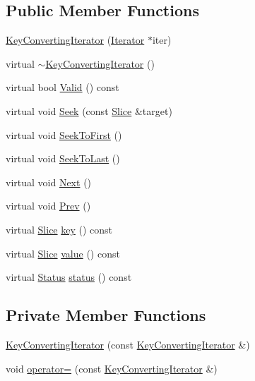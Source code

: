 \subsection*{Public Member Functions}
\begin{DoxyCompactItemize}
\item 
\hyperlink{classleveldb_1_1_key_converting_iterator_a7b5c28a94749f2e02ecc9021bb9adb51}{Key\+Converting\+Iterator} (\hyperlink{classleveldb_1_1_iterator}{Iterator} $\ast$iter)
\item 
virtual \hyperlink{classleveldb_1_1_key_converting_iterator_a2a774b0a90768168394ca0c35ba3a87e}{$\sim$\+Key\+Converting\+Iterator} ()
\item 
virtual bool \hyperlink{classleveldb_1_1_key_converting_iterator_a941cabf2e0b1c9647faa037b7ad55668}{Valid} () const 
\item 
virtual void \hyperlink{classleveldb_1_1_key_converting_iterator_a6af9b763a5831c2fdcd8c3bebfef6ae4}{Seek} (const \hyperlink{classleveldb_1_1_slice}{Slice} \&target)
\item 
virtual void \hyperlink{classleveldb_1_1_key_converting_iterator_a56a6b7b97747d5e33981a66c28670cc9}{Seek\+To\+First} ()
\item 
virtual void \hyperlink{classleveldb_1_1_key_converting_iterator_a9db639879c442a67234fc345887b19fc}{Seek\+To\+Last} ()
\item 
virtual void \hyperlink{classleveldb_1_1_key_converting_iterator_a6b468c158da3f6abbc697f7728811da8}{Next} ()
\item 
virtual void \hyperlink{classleveldb_1_1_key_converting_iterator_adff607836b7b3d117a524b3d440bc55a}{Prev} ()
\item 
virtual \hyperlink{classleveldb_1_1_slice}{Slice} \hyperlink{classleveldb_1_1_key_converting_iterator_a46402aaa27d57c5b2bee4f560c2dc04b}{key} () const 
\item 
virtual \hyperlink{classleveldb_1_1_slice}{Slice} \hyperlink{classleveldb_1_1_key_converting_iterator_aa7a0281f93fbd520bf54d94bac77197a}{value} () const 
\item 
virtual \hyperlink{classleveldb_1_1_status}{Status} \hyperlink{classleveldb_1_1_key_converting_iterator_a10d0f5b6b83bc967ba5c73d6bfc919f3}{status} () const 
\end{DoxyCompactItemize}
\subsection*{Private Member Functions}
\begin{DoxyCompactItemize}
\item 
\hyperlink{classleveldb_1_1_key_converting_iterator_a33bd543eacf7dc1a9820c0c8e47d8786}{Key\+Converting\+Iterator} (const \hyperlink{classleveldb_1_1_key_converting_iterator}{Key\+Converting\+Iterator} \&)
\item 
void \hyperlink{classleveldb_1_1_key_converting_iterator_a33c88b1339f4ea2e21517c3ef87d3fa9}{operator=} (const \hyperlink{classleveldb_1_1_key_converting_iterator}{Key\+Converting\+Iterator} \&)
\end{DoxyCompactItemize}
